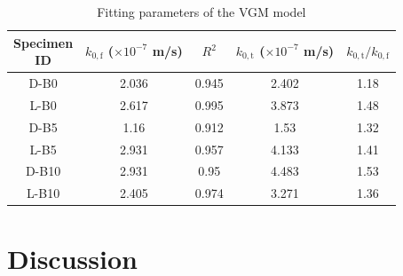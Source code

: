 \begin{table}[htbp]
    \centering
    \caption{Fitting parameters of the VGM model}
    \label{tab:ch3_vgm_fitting_parameters}
    \begingroup
    \renewcommand{\arraystretch}{1.15}
    \setlength{\tabcolsep}{2pt}
    \begin{tabular*}{\textwidth}{@{\extracolsep{\fill}}ccccc@{}}
        \toprule
        \makecell[c]{Specimen\\ID} & \makecell[c]{$k_{0,\mathrm{f}}$\\($\times 10^{-7}$ m/s)} & $R^2$ & \makecell[c]{$k_{0,\mathrm{t}}$\\($\times 10^{-7}$ m/s)} & $k_{0,\mathrm{t}}/k_{0,\mathrm{f}}$ \\
        \midrule
        D-B0  & 2.036 & 0.945 & 2.402 & 1.18 \\
        L-B0  & 2.617 & 0.995 & 3.873 & 1.48 \\
        D-B5  & 1.16  & 0.912 & 1.53  & 1.32 \\
        L-B5  & 2.931 & 0.957 & 4.133 & 1.41 \\
        D-B10 & 2.931 & 0.95  & 4.483 & 1.53 \\
        L-B10 & 2.405 & 0.974 & 3.271 & 1.36 \\
        \bottomrule
    \end{tabular*}
    \endgroup
\end{table}

\section{Discussion}
\label{sec:ch3discussion}
